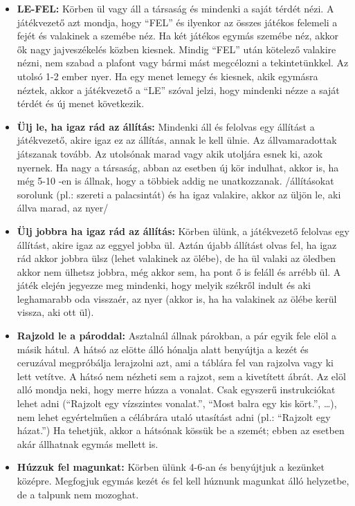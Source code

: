 \documentclass[a4paper, 12pt, twoside, openright]{article}
\begin{document}
\begin{itemize}
\item \textbf{LE-FEL:} Körben ül vagy áll a társaság és mindenki a saját térdét nézi. A játékvezető azt mondja, hogy ``FEL'' és ilyenkor az összes játékos felemeli a fejét és valakinek a szemébe néz. Ha két játékos egymás szemébe néz, akkor ők nagy jajveszékelés közben kiesnek. Mindig ``FEL'' után kötelező valakire nézni, nem szabad a plafont vagy bármi mást megcélozni a tekintetünkkel. Az utolsó 1-2 ember nyer. Ha egy menet lemegy és kiesnek, akik egymásra néztek, akkor a játékvezető a ``LE'' szóval jelzi, hogy mindenki nézze a saját térdét és új menet következik.

\item \textbf{Ülj le, ha igaz rád az állítás:} Mindenki áll és felolvas egy állítást a játékvezető, akire igaz ez az állítás, annak le kell ülnie. Az állvamaradottak játszanak tovább. Az utolsónak marad vagy akik utoljára esnek ki, azok nyernek. Ha nagy a társaság, abban az esetben új kör indulhat, akkor is, ha még 5-10 -en is állnak, hogy a többiek addig ne unatkozzanak.
/állításokat sorolunk (pl.: szereti a palacsintát) és ha igaz valakire, akkor az üljön le, aki állva marad, az nyer/

\item \textbf{Ülj jobbra ha igaz rád az állítás:} Körben ülünk, a játékvezető felolvas egy állítást, akire igaz az eggyel jobba ül. Aztán újabb állítást olvas fel, ha igaz rád akkor jobbra ülsz (lehet valakinek az ölébe), de ha ül valaki az öledben akkor nem ülhetsz jobbra, még akkor sem, ha pont ő is feláll és arrébb ül. A játék elején jegyezze meg mindenki, hogy melyik székről indult és aki leghamarabb oda visszaér, az nyer (akkor is, ha ha valakinek az ölébe kerül vissza, aki ott ül).

\item \textbf{Rajzold le a pároddal:} Asztalnál állnak párokban, a pár egyik fele elöl a másik hátul. A hátsó az elötte álló hónalja alatt benyújtja a kezét és ceruzával megpróbálja lerajzolni azt, ami a táblára fel van rajzolva vagy ki lett vetítve.  A hátsó nem nézheti sem a rajzot, sem a kivetített ábrát. Az elöl alló mondja neki, hogy merre húzza a vonalat. Csak egyszerű instrukciókat lehet adni (``Rajzolt egy vízszintes vonalat.'', ``Most balra egy kis kört.'', \dots{}), nem lehet egyértelműen a célábrára utaló utasítást adni (pl.: ``Rajzolt egy házat.'') Ha tehetjük, akkor a hátsónak kössük be a szemét; ebben az esetben akár állhatnak egymás mellett is.

\item \textbf{Húzzuk fel magunkat:} Körben ülünk 4-6-an és benyújtjuk a kezünket középre. Megfogjuk egymás kezét és fel kell húznunk magunkat álló helyzetbe, de a talpunk nem mozoghat.


\end{itemize}
\end{document}
